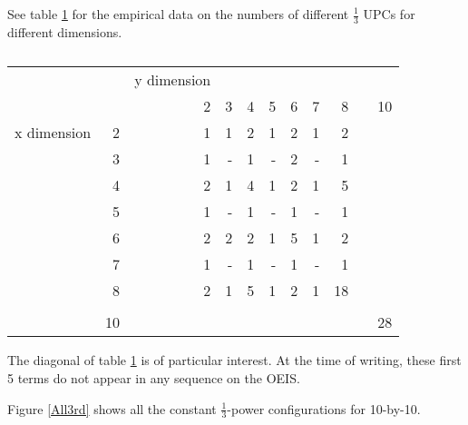 \documentclass[12pt]{article}
\theoremstyle{definition}
\theoremstyle{remark}
\theoremstyle{remark}
\begin{document}
\par
See table \ref{Empirical3UPCs} for the empirical data on the numbers of different $\frac{1}{3}$ UPCs for different dimensions.
\begin{table}
\begin{tabular}{l r | *{9}{r} }
  & & y dimension & & & & & & \\
  & & 2 & 3 & 4 & 5 & 6 & 7 & 8 & & 10\\ \hline
  x dimension & 2 & 1 & 1 & 2 & 1 & 2 & 1 & 2 \\
  & 3 & 1 & - & 1 & - & 2 & - & 1 \\
  & 4 & 2 & 1 & 4 & 1 & 2 & 1 & 5 \\
  & 5 & 1 & - & 1 & - & 1 & - & 1 \\
  & 6 & 2 & 2 & 2 & 1 & 5 & 1 & 2 \\
  & 7 & 1 & - & 1 & - & 1 & - & 1 \\
  & 8 & 2 & 1 & 5 & 1 & 2 & 1 & 18 \\
  & \\
& 10 & & & & & & & & & 28 \\
\end{tabular}
\caption{}
\label{Empirical3UPCs}
\end{table}
The diagonal of table \ref{Empirical3UPCs} is of particular interest. At the time of writing, these first 5 terms do not appear in any sequence on the OEIS. \\

\par Figure \ref{All3rd} shows all the constant $\frac{1}{3}$-power configurations for 10-by-10. 
\end{document}
